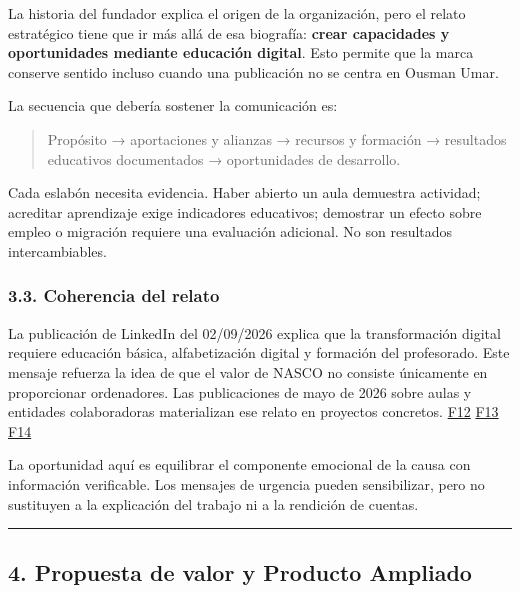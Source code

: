 \documentclass[
]{article}
\begin{document}
La historia del fundador explica el origen de la organización, pero el
relato estratégico tiene que ir más allá de esa biografía: \textbf{crear
capacidades y oportunidades mediante educación digital}. Esto permite
que la marca conserve sentido incluso cuando una publicación no se
centra en Ousman Umar.

La secuencia que debería sostener la comunicación es:

\begin{quote}
Propósito → aportaciones y alianzas → recursos y formación → resultados
educativos documentados → oportunidades de desarrollo.
\end{quote}

Cada eslabón necesita evidencia. Haber abierto un aula demuestra
actividad; acreditar aprendizaje exige indicadores educativos; demostrar
un efecto sobre empleo o migración requiere una evaluación adicional. No
son resultados intercambiables.

\hypertarget{coherencia-del-relato}{%
\subsubsection{3.3. Coherencia del relato}\label{coherencia-del-relato}}

La publicación de LinkedIn del 02/09/2026 explica que la transformación
digital requiere educación básica, alfabetización digital y formación
del profesorado. Este mensaje refuerza la idea de que el valor de NASCO
no consiste únicamente en proporcionar ordenadores. Las publicaciones de
mayo de 2026 sobre aulas y entidades colaboradoras materializan ese
relato en proyectos concretos.
\href{https://www.linkedin.com/posts/nasco-feeding-minds_nascofoundation-educaci\%C3\%B3ndigital-impactosocial-activity-7500847528586846208-5q6E}{F12}
\href{https://www.linkedin.com/posts/nasco-feeding-minds_nascofoundation-feedingminds-digitaleducation-activity-7465326634426843136-PKBW}{F13}
\href{https://www.linkedin.com/posts/nasco-feeding-minds_nasco-x-deloitte-activity-7464593630444306432-8i9r}{F14}

La oportunidad aquí es equilibrar el componente emocional de la causa
con información verificable. Los mensajes de urgencia pueden
sensibilizar, pero no sustituyen a la explicación del trabajo ni a la
rendición de cuentas.

\begin{center}\rule{0.5\linewidth}{0.5pt}\end{center}

\hypertarget{propuesta-de-valor-y-producto-ampliado}{%
\subsection{4. Propuesta de valor y Producto
Ampliado}\label{propuesta-de-valor-y-producto-ampliado}}
\end{document}
